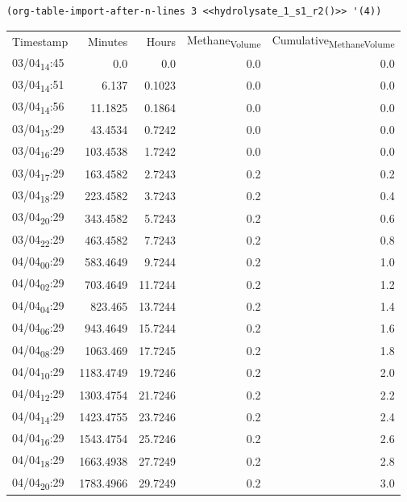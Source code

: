 \documentclass[11pt]{article}
\begin{document}
\begin{verbatim}
(org-table-import-after-n-lines 3 <<hydrolysate_1_s1_r2()>> '(4))
\end{verbatim}

\begin{center}
\begin{tabular}{lrrrr}
Timestamp & Minutes & Hours & Methane\textsubscript{Volume} & Cumulative\textsubscript{Methane}\textsubscript{Volume}\\[0pt]
03/04\textsubscript{14}:45 & 0.0 & 0.0 & 0.0 & 0.0\\[0pt]
03/04\textsubscript{14}:51 & 6.137 & 0.1023 & 0.0 & 0.0\\[0pt]
03/04\textsubscript{14}:56 & 11.1825 & 0.1864 & 0.0 & 0.0\\[0pt]
03/04\textsubscript{15}:29 & 43.4534 & 0.7242 & 0.0 & 0.0\\[0pt]
03/04\textsubscript{16}:29 & 103.4538 & 1.7242 & 0.0 & 0.0\\[0pt]
03/04\textsubscript{17}:29 & 163.4582 & 2.7243 & 0.2 & 0.2\\[0pt]
03/04\textsubscript{18}:29 & 223.4582 & 3.7243 & 0.2 & 0.4\\[0pt]
03/04\textsubscript{20}:29 & 343.4582 & 5.7243 & 0.2 & 0.6\\[0pt]
03/04\textsubscript{22}:29 & 463.4582 & 7.7243 & 0.2 & 0.8\\[0pt]
04/04\textsubscript{00}:29 & 583.4649 & 9.7244 & 0.2 & 1.0\\[0pt]
04/04\textsubscript{02}:29 & 703.4649 & 11.7244 & 0.2 & 1.2\\[0pt]
04/04\textsubscript{04}:29 & 823.465 & 13.7244 & 0.2 & 1.4\\[0pt]
04/04\textsubscript{06}:29 & 943.4649 & 15.7244 & 0.2 & 1.6\\[0pt]
04/04\textsubscript{08}:29 & 1063.469 & 17.7245 & 0.2 & 1.8\\[0pt]
04/04\textsubscript{10}:29 & 1183.4749 & 19.7246 & 0.2 & 2.0\\[0pt]
04/04\textsubscript{12}:29 & 1303.4754 & 21.7246 & 0.2 & 2.2\\[0pt]
04/04\textsubscript{14}:29 & 1423.4755 & 23.7246 & 0.2 & 2.4\\[0pt]
04/04\textsubscript{16}:29 & 1543.4754 & 25.7246 & 0.2 & 2.6\\[0pt]
04/04\textsubscript{18}:29 & 1663.4938 & 27.7249 & 0.2 & 2.8\\[0pt]
04/04\textsubscript{20}:29 & 1783.4966 & 29.7249 & 0.2 & 3.0\\[0pt]

\end{tabular}
\end{center}
\end{document}
